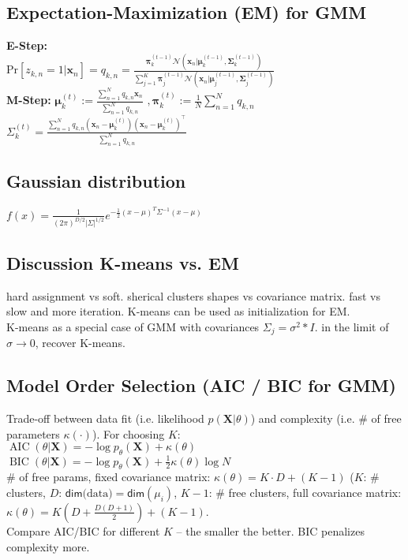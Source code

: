 \subsection*{Expectation-Maximization (EM) for GMM}
\textbf{E-Step: }\\
Pr$[z_{k,n} = 1 | \mathbf{x}_n] = q_{k, n} = \frac{\boldsymbol{\pi}_k^{(t-1)} \mathcal{N}(\mathbf{x}_n | \boldsymbol{\mu}_k^{(t-1)}, \boldsymbol{\Sigma}_k^{(t-1)})}{\sum_{j=1}^K \boldsymbol{\pi}_j^{(t-1)} \mathcal{N}(\mathbf{x}_n | \boldsymbol{\mu}_j^{(t-1)}, \boldsymbol{\Sigma}_j^{(t-1)})}$\\
\textbf{M-Step: } $\boldsymbol{\mu}_k^{(t)} := \frac{\sum_{n=1}^N q_{k,n} \mathbf{x}_n}{\sum_{n=1}^N q_{k,n}}$
$, \boldsymbol{\pi}_k^{(t)} := \frac{1}{N} \sum_{n=1}^N q_{k,n}$\\
$\Sigma_k^{(t)} = \frac{\sum_{n=1}^N q_{k, n} (\mathbf{x}_n - \boldsymbol{\mu}_k^{(t)})(\mathbf{x}_n - \boldsymbol{\mu}_k^{(t)})^\top}{\sum_{n=1}^N q_{k,n}}$

\subsection*{Gaussian distribution}
$f(x) = \frac{1}{(2\pi)^{D/2}|\Sigma|^{1/2}} e^{- \frac{1}{2} (x-\mu)^T \Sigma^{-1} (x-\mu)}$
\subsection*{Discussion K-means vs. EM}
hard assignment vs soft. sherical clusters shapes vs covariance matrix. fast vs slow and more iteration. K-means can be used as initialization for EM.\\
K-means as a special case of GMM with covariances $\Sigma_j = \sigma^2 * I$. in the limit of $\sigma \rightarrow 0$, recover K-means.

\subsection*{Model Order Selection (AIC / BIC for GMM)}
Trade-off between data fit (i.e. likelihood $p(\mathbf{X} | \theta)$) and complexity (i.e. \# of free parameters $\kappa(\cdot)$). For choosing $K$:\\
 $\operatorname{AIC}(\theta | \mathbf{X}) = -\log p_\theta(\mathbf{X}) + \kappa(\theta)$\\
 $\operatorname{BIC}(\theta | \mathbf{X}) = -\log p_\theta(\mathbf{X}) + \frac{1}{2} \kappa(\theta) \log N$\\
\# of free params, fixed covariance matrix: $\kappa(\theta) = K \cdot D + (K - 1)$ ($K$: \# clusters, $D$: $\mathsf{dim}\text{(data)}=\mathsf{dim}(\mu_i)$, $K-1$: \# free clusters, full covariance matrix: $\kappa(\theta) = K(D + \frac{D(D+1)}{2}) + (K - 1)$.\\
Compare AIC/BIC for different $K$ -- the smaller the better. BIC penalizes complexity more.

